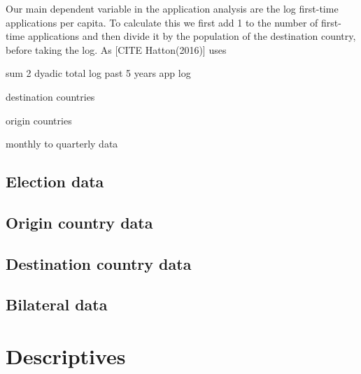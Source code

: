 \documentclass[11pt,a4paper]{scrartcl}
\begin{document}
Our main dependent variable in the application analysis are the log first-time applications per capita. To calculate this we first add 1 to the number of first-time applications and then divide it by the population of the destination country, before taking the log. As [CITE Hatton(2016)] uses 



sum 2 dyadic total
log past 5 years app
log 

destination countries

origin countries

monthly to quarterly data


\subsection{Election data}
\subsection{Origin country data}
\subsection{Destination country data}
\subsection{Bilateral data}


\clearpage
\FloatBarrier
\section{Descriptives}


 

 
 

 

\clearpage
\FloatBarrier
\end{document}
